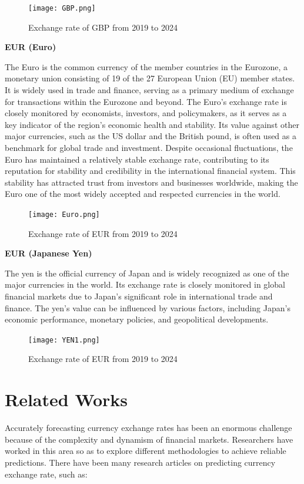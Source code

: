 \documentclass{ieeeojies}
\begin{document}
\begin{figure}[h]
    \centering
    \texttt{[image: GBP.png]}
    \label{fig:us_image}
    \caption{Exchange rate of GBP from 2019 to 2024}
    \end{figure}



\raggedright
\bigskip
\textbf{EUR (Euro)}
\bigskip

The Euro is the common currency of the member countries in the Eurozone, a monetary union consisting of 19 of the 27 European Union (EU) member states. It is widely used in trade and finance, serving as a primary medium of exchange for transactions within the Eurozone and beyond. The Euro's exchange rate is closely monitored by economists, investors, and policymakers, as it serves as a key indicator of the region's economic health and stability. Its value against other major currencies, such as the US dollar and the British pound, is often used as a benchmark for global trade and investment. Despite occasional fluctuations, the Euro has maintained a relatively stable exchange rate, contributing to its reputation for stability and credibility in the international financial system. This stability has attracted trust from investors and businesses worldwide, making the Euro one of the most widely accepted and respected currencies in the world.
\begin{figure}[h]
    \centering
    \texttt{[image: Euro.png]}
    \caption{Exchange rate of EUR from 2019 to 2024}
    \label{fig:euro_image}
\end{figure}


\bigskip
\textbf{EUR (Japanese Yen)}
\bigskip

The yen is the official currency of Japan and is widely recognized as one of the major currencies in the world. Its exchange rate is closely monitored in global financial markets due to Japan's significant role in international trade and finance. The yen's value can be influenced by various factors, including Japan's economic performance, monetary policies, and geopolitical developments.
\begin{figure}[h]
    \centering
    \texttt{[image: YEN1.png]}
    \label{fig:yen_image}
    \caption{Exchange rate of EUR from 2019 to 2024}
\end{figure}

\section{Related Works}
Accurately forecasting currency exchange rates has been an enormous challenge because of the complexity and dynamism of financial markets. Researchers have worked in this area so as to explore different methodologies to achieve reliable predictions. There have been many research articles on predicting currency exchange rate, such as:
\end{document}
